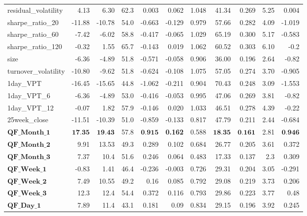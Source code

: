 \documentclass[preprint,12pt]{elsarticle}
\begin{document}
{\begin{longtable}{lrrrrrrrrrr}
    residual\_volatility &   4.13 &  6.30 &   62.3 &   0.003 & 0.062 & 1.048 &     41.34 & 0.269 & 5.25 & 0.004 \\
    sharpe\_ratio\_20 &   -11.88 &  -10.78 &   54.0 &   -0.663 & -0.129 & 0.979 &     57.66 & 0.282  & 4.09 & -1.019\\
    sharpe\_ratio\_60 &   -7.42 &  -6.02 &   58.8 &   -0.417 & -0.065 & 1.029 &     65.19 & 0.300 & 5.17 & -0.583 \\
    sharpe\_ratio\_120 &   -0.32 &  1.55 &   65.7 &   -0.143 & 0.019 & 1.062 &     60.52 & 0.303 & 6.10 & -0.2 \\
    size &   -6.36 &  -4.89 &   51.8 &   -0.571 & -0.058 & 0.906 &     36.00 & 0.196 & 2.64 &  -0.82 \\
    turnover\_volatility &   -10.80 &  -9.62 &   51.8 &   -0.624 & -0.108 & 1.075 &     57.05 & 0.274  & 3.70 & -0.905\\
    1day\_VPT &   -16.45 &  -15.65 &   44.8 &   -1.062 & -0.211 & 0.904 &     70.43 & 0.248 & 3.09 & -1.553 \\
    1day\_VPT\_6 &   -6.36 &  -4.89 &   53.0 &   -0.416 & -0.053 & 0.995 &     47.06 & 0.269 & 3.81 &  -0.82\\
    1day\_VPT\_12 &   -0.07 &  1.82 &   57.9 &   -0.146 & 0.020 & 1.033 &     46.51 & 0.278 & 4.39 &  -0.22 \\
    25week\_close &   -11.51 &  -10.39 &   51.0 &   -0.859 & -0.133 & 0.817 &     47.79 & 0.211 & 2.44 &  -0.684\\
    $\textbf{QF\_Month\_1}$ &   $\textbf{17.35}$ &             $\textbf{19.43}$ &    57.8 &        $ \textbf{0.915}$  &  \textbf{0.162} & 0.588 &   $\textbf{18.35}$ & $\textbf{0.161}$  & 2.81 & $\textbf{0.946}$ \\
    $\textbf{QF\_Month\_2}$ & 9.91  & 13.53     & 49.3   &  0.289   & 0.102  & 0.684 &  26.77 & 0.205  & 3.61 & 0.372 \\
   $\textbf{QF\_Month\_3}$ &  7.37  &  10.4     &  51.6  & 0.246    & 0.064  & 0.483 & 17.33  & 0.137  & 2.3 & 0.309 \\
   $\textbf{QF\_Week\_1}$ &  -0.83  & 1.41     &  46.4  &  -0.236     & -0.003  & 0.726 & 29.31  & 0.204  & 3.05 & -0.291 \\
   $\textbf{QF\_Week\_2}$ &  7.49  & 10.55    & 49.2   & 0.16      & 0.085  & 0.792 & 29.08  & 0.219  & 3.73 & 0.206 \\
   $\textbf{QF\_Week\_3}$ &  12.3  &   12.4   &  54.4  &  0.372     & 0.116  & 0.793 & 29.86  &  0.223 & 3.77 & 0.48 \\
   $\textbf{QF\_Day\_1}$ & 7.89   &  11.4   & 43.1   &  0.181     & 0.09  & 0.834 & 29.15  & 0.196  & 3.92 & 0.245 \\

\end{longtable}}
\end{document}

